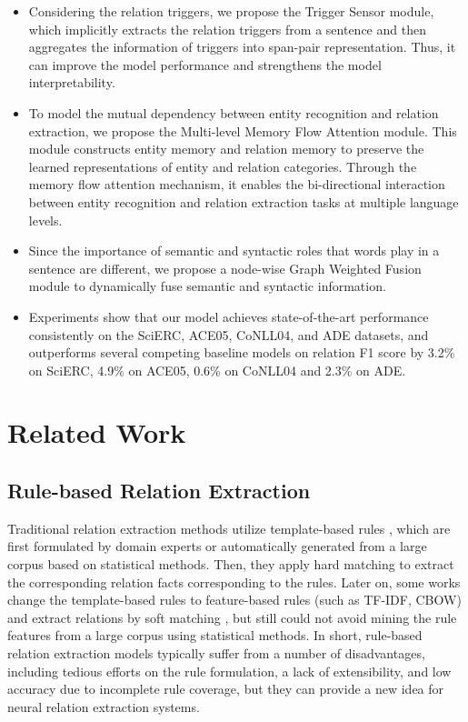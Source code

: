 \documentclass[sigconf]{acmart}
\begin{document}
\begin{itemize}
    \item Considering the relation triggers, we propose the Trigger Sensor module, which implicitly extracts the relation triggers from a sentence and then aggregates the information of triggers into span-pair representation. Thus, it can improve the model performance and strengthens the model interpretability.
    \item To model the mutual dependency between entity recognition and relation extraction, we propose the Multi-level Memory Flow Attention module. This module constructs entity memory and relation memory to preserve the learned representations of entity and relation categories. Through the memory flow attention mechanism, it enables the bi-directional interaction between entity recognition and relation extraction tasks at multiple language levels.
    \item Since the importance of semantic and syntactic roles that words play in a sentence are different, we propose a node-wise Graph Weighted Fusion module to dynamically fuse semantic and syntactic information.
    \item Experiments show that our model achieves state-of-the-art performance consistently on the SciERC, ACE05, CoNLL04, and ADE datasets, and outperforms several competing baseline models on relation F1 score by 3.2\% on SciERC, 4.9\% on ACE05, 0.6\% on CoNLL04 and 2.3\% on ADE.
\end{itemize}

\section{Related Work}
\subsection{Rule-based Relation Extraction}

Traditional relation extraction methods utilize template-based rules \cite{aone1998sra, miller2000novel, fundel2007relex}, which are first formulated by domain experts or automatically generated from a large corpus based on statistical methods. Then, they apply hard matching to extract the corresponding relation facts corresponding to the rules. Later on, some works change the template-based rules to feature-based rules (such as TF-IDF, CBOW) and extract relations by soft matching \cite{kambhatla2004combining, zhang2006exploring, jiang2007systematic, bui2011hybrid}, but still could not avoid mining the rule features from a large corpus using statistical methods. In short, rule-based relation extraction models typically suffer from a number of disadvantages, including tedious efforts on the rule formulation, a lack of extensibility, and low accuracy due to incomplete rule coverage, but they can provide a new idea for neural relation extraction systems.
\end{document}
